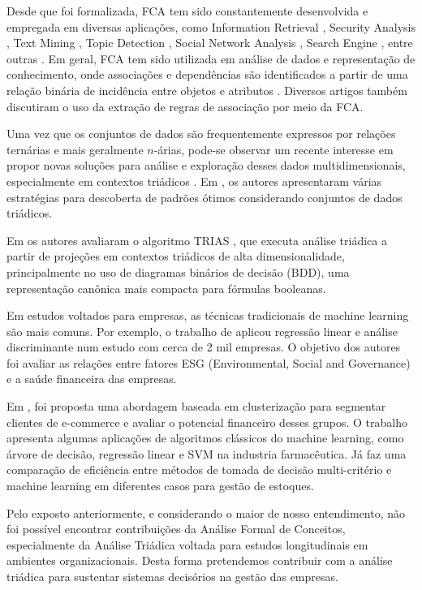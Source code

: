 \documentclass[kdmile,a4paper]{kdmile} %
\begin{document}
Desde que foi formalizada, FCA tem sido constantemente desenvolvida e empregada em diversas aplicações, como Information Retrieval \cite{Kumar2012}, Security Analysis \cite{Poelmans2013}, Text Mining \cite{DeMaio2014}, Topic Detection \cite{Cigarran2016}, Social Network Analysis \cite{MissaouiSergei2017}, Search Engine \cite{Negm2017}, entre outras \cite{Singh2011}. Em geral, FCA tem sido utilizada em análise de dados e representação de conhecimento, onde associações e dependências são identificados a partir de uma relação binária de incidência entre objetos e atributos \cite{c01,c10}. Diversos artigos \cite{Disc1998,u07,u59,u50} também discutiram o uso da extração de regras de associação por meio da FCA.

Uma vez que os conjuntos de dados são frequentemente expressos por relações ternárias e mais geralmente $n$-árias, pode-se observar um recente interesse em propor novas soluções para análise e exploração desses dados multidimensionais, especialmente em contextos triádicos \cite{Bazin2020,Felde2021}. Em \cite{trias01}, os autores apresentaram várias estratégias para descoberta de padrões ótimos considerando conjuntos de dados triádicos.

Em \cite{kaio:21} os autores avaliaram o algoritmo TRIAS \cite{Trias}, que executa análise triádica a partir de projeções em contextos triádicos de alta dimensionalidade, principalmente no uso de diagramas binários de decisão (BDD), uma representação canônica mais compacta para fórmulas booleanas.

Em estudos voltados para empresas, as técnicas tradicionais de machine learning são mais comuns. Por exemplo, o trabalho de \cite{lima:24} aplicou regressão linear e análise discriminante num estudo com cerca de 2 mil empresas. O objetivo dos autores foi avaliar as relações entre fatores ESG (Environmental, Social and Governance) e a saúde financeira das empresas.

Em \cite{falqueto:22}, foi proposta uma abordagem baseada em clusterização para segmentar clientes de e-commerce e avaliar o potencial financeiro desses grupos. O trabalho \cite{campos:21} apresenta algumas aplicações de algoritmos clássicos do machine learning, como árvore de decisão, regressão linear e SVM na industria farmacêutica. Já \cite{vidal:20} faz uma comparação de eficiência entre métodos de tomada de decisão multi-critério e machine learning em diferentes casos para gestão de estoques.

Pelo exposto anteriormente, e considerando o maior de nosso entendimento, não foi possível encontrar contribuições da Análise Formal de Conceitos, especialmente da Análise Triádica voltada para estudos longitudinais em ambientes organizacionais. Desta forma pretendemos contribuir com a análise triádica para sustentar sistemas decisórios na gestão das empresas.
\end{document}
